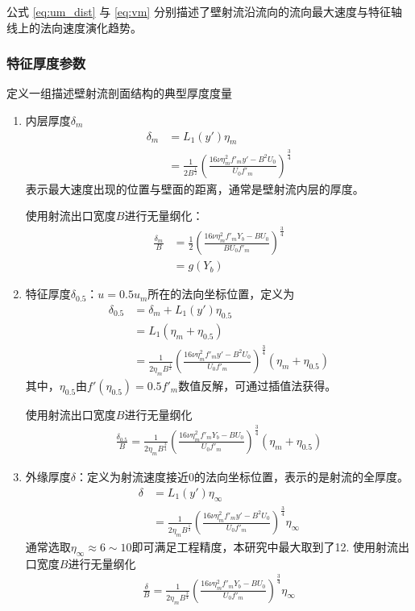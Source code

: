 公式 \eqref{eq:um_dist} 与 \eqref{eq:vm} 分别描述了壁射流沿流向的流向最大速度与特征轴线上的法向速度演化趋势。




\subsubsection{特征厚度参数}
定义一组描述壁射流剖面结构的典型厚度度量

\begin{enumerate}
    \item 内层厚度$\delta_{m}$
    \begin{align*}
        \delta_{m}&=L_{1}(y')\eta_{m}\\
        &=\frac{1}{2B^{\frac{1}{2}}}\left(\frac{16\nu\eta_{m}^{2}f'_{m}y'-B^{2}U_{0}}{U_{0}f'_{m}}\right)^{\frac{3}{4}}
    \end{align*}
    表示最大速度出现的位置与壁面的距离，通常是壁射流内层的厚度。

使用射流出口宽度$B$进行无量纲化：
\begin{align}
    \frac{\delta_{m}}{B}&=\frac{1}{2}\left(\frac{16\nu\eta_{m}^{2}f'_{m}Y_{b}-BU_{0}}{BU_{0}f'_{m}}\right)^{\frac{3}{4}}\\
    &=g(Y_{b})
\end{align}
    \item 特征厚度$\delta_{0.5}$：$u=0.5u_{m}$所在的法向坐标位置，定义为
    \begin{align*}
        \delta_{0.5}&=\delta_{m}+L_{1}(y')\eta_{0.5}\\
        &=L_{1}(\eta_{m}+\eta_{0.5})\\
        &=\frac{1}{2\eta_{m}B^{\frac{1}{2}}}\left(\frac{16\nu\eta_{m}^{2}f'_{m}y'-B^{2}U_{0}}{U_{0}f'_{m}}\right)^{\frac{3}{4}}(\eta_{m}+\eta_{0.5})
    \end{align*}
    其中，$\eta_{0.5}$由$f'(\eta_{0.5})=0.5f'_{m}$数值反解，可通过插值法获得。
    
    使用射流出口宽度$B$进行无量纲化
    \begin{align}
        \frac{\delta_{0.5}}{B}=\frac{1}{2\eta_{m}B^{\frac{3}{4}}}\left(\frac{16\nu\eta_{m}^{2}f'_{m}Y_{b}-BU_{0}}{U_{0}f'_{m}}\right)^{\frac{3}{4}}(\eta_{m}+\eta_{0.5})
    \end{align}
    \item 外缘厚度$\delta$：定义为射流速度接近0的法向坐标位置，表示的是射流的全厚度。
    \begin{align*}
        \delta&=L_{1}(y')\eta_{\infty}\\
        &=\frac{1}{2\eta_{m}B^{\frac{1}{2}}}\left(\frac{16\nu\eta_{m}^{2}f'_{m}y'-B^{2}U_{0}}{U_{0}f'_{m}}\right)^{\frac{3}{4}}\eta_{\infty}
    \end{align*}
    通常选取$\eta_{\infty}\approx 6\sim10$即可满足工程精度，本研究中最大取到了12.
    使用射流出口宽度$B$进行无量纲化
    \begin{align}
        \frac{\delta}{B}=\frac{1}{2\eta_{m}B^{\frac{3}{4}}}\left(\frac{16\nu\eta_{m}^{2}f'_{m}Y_{b}-BU_{0}}{U_{0}f'_{m}}\right)^{\frac{3}{4}}\eta_{\infty}
    \end{align}
\end{enumerate}


